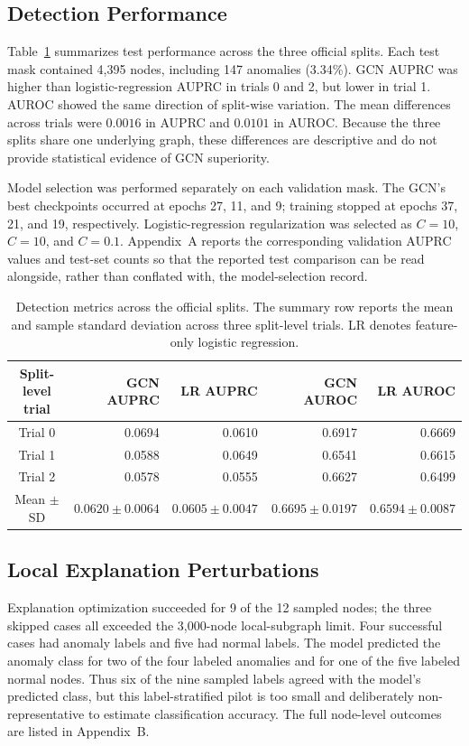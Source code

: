 \documentclass[11pt,a4paper]{article}
\begin{document}
\subsection{Detection Performance}
Table~\ref{tab:detection} summarizes test performance across the three official splits. Each test mask contained 4,395 nodes, including 147 anomalies (3.34\%). GCN AUPRC was higher than logistic-regression AUPRC in trials 0 and 2, but lower in trial 1. AUROC showed the same direction of split-wise variation. The mean differences across trials were $0.0016$ in AUPRC and $0.0101$ in AUROC. Because the three splits share one underlying graph, these differences are descriptive and do not provide statistical evidence of GCN superiority.

Model selection was performed separately on each validation mask. The GCN's best checkpoints occurred at epochs 27, 11, and 9; training stopped at epochs 37, 21, and 19, respectively. Logistic-regression regularization was selected as $C=10$, $C=10$, and $C=0.1$. Appendix~A reports the corresponding validation AUPRC values and test-set counts so that the reported test comparison can be read alongside, rather than conflated with, the model-selection record.

\begin{table}[t]
\centering
\small
\caption{Detection metrics across the official splits. The summary row reports the mean and sample standard deviation across three split-level trials. LR denotes feature-only logistic regression.}
\label{tab:detection}
\begin{tabular}{c r r r r}
\toprule
Split-level trial & GCN AUPRC & LR AUPRC & GCN AUROC & LR AUROC\\
\midrule
Trial 0 & 0.0694 & 0.0610 & 0.6917 & 0.6669\\
Trial 1 & 0.0588 & 0.0649 & 0.6541 & 0.6615\\
Trial 2 & 0.0578 & 0.0555 & 0.6627 & 0.6499\\
\midrule
Mean $\pm$ SD & $0.0620\pm0.0064$ & $0.0605\pm0.0047$ & $0.6695\pm0.0197$ & $0.6594\pm0.0087$\\
\bottomrule
\end{tabular}
\end{table}

\subsection{Local Explanation Perturbations}
Explanation optimization succeeded for 9 of the 12 sampled nodes; the three skipped cases all exceeded the 3,000-node local-subgraph limit. Four successful cases had anomaly labels and five had normal labels. The model predicted the anomaly class for two of the four labeled anomalies and for one of the five labeled normal nodes. Thus six of the nine sampled labels agreed with the model's predicted class, but this label-stratified pilot is too small and deliberately non-representative to estimate classification accuracy. The full node-level outcomes are listed in Appendix~B.
\end{document}
